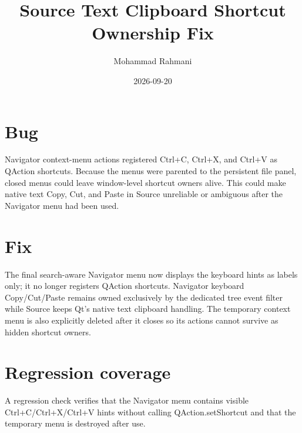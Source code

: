 \documentclass[a4paper]{article}
\title{Source Text Clipboard Shortcut Ownership Fix}
\date{2026-09-20}
\author{Mohammad Rahmani}
\begin{document}
   \maketitle

   \begin{preview}
      \section{Bug}
      Navigator context-menu actions registered Ctrl+C, Ctrl+X, and Ctrl+V as
      QAction shortcuts. Because the menus were parented to the persistent file
      panel, closed menus could leave window-level shortcut owners alive. This
      could make native text Copy, Cut, and Paste in Source unreliable or
      ambiguous after the Navigator menu had been used.

      \section{Fix}
      The final search-aware Navigator menu now displays the keyboard hints as
      labels only; it no longer registers QAction shortcuts. Navigator keyboard
      Copy/Cut/Paste remains owned exclusively by the dedicated tree event
      filter while Source keeps Qt's native text clipboard handling. The
      temporary context menu is also explicitly deleted after it closes so its
      actions cannot survive as hidden shortcut owners.

      \section{Regression coverage}
      A regression check verifies that the Navigator menu contains visible
      Ctrl+C/Ctrl+X/Ctrl+V hints without calling QAction.setShortcut and that
      the temporary menu is destroyed after use.
   \end{preview}

   
   
\end{document}
